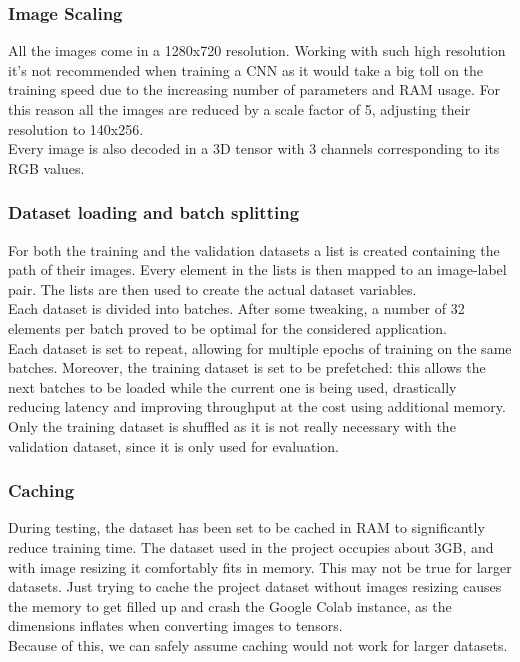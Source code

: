 \documentclass[a4paper,12pt]{article}
\begin{document}
\subsubsection{Image Scaling}
All the images come in a 1280x720 resolution. Working with such high resolution it's not 
recommended when training a CNN as it would take a big toll on the training speed due to the increasing number of parameters and RAM usage. 
For this reason all the images are reduced by a scale factor of 5, adjusting their resolution to 140x256.\\
Every image is also decoded in a 3D tensor with 3 channels corresponding to its RGB values.

\subsubsection{Dataset loading and batch splitting}
For both the training and the validation datasets a list is created containing the path of their images. 
Every element in the lists is then mapped to an image-label pair. The lists are then used to create the actual dataset variables.\\
Each dataset is divided into batches. After some tweaking, a number of 32 elements per batch proved to be optimal for the considered application.\\
Each dataset is set to repeat, allowing for multiple epochs of training on the same batches. Moreover, the training dataset is set to be prefetched: 
this allows the next batches to be loaded while the current one is being used, drastically reducing latency and improving throughput at the cost using additional memory.\\
Only the training dataset is shuffled as it is not really necessary with the validation dataset, since it is only used for evaluation.

\subsubsection{Caching}
During testing, the dataset has been set to be cached in RAM to significantly reduce training time. The dataset used in the project occupies about 3GB, and with image resizing it comfortably fits in memory. This may not be true for larger datasets. Just trying to cache the project dataset without images resizing causes the memory to get filled up and crash the Google Colab instance, as the dimensions inflates when converting images to tensors.\\
Because of this, we can safely assume caching would not work for larger datasets.
\end{document}
